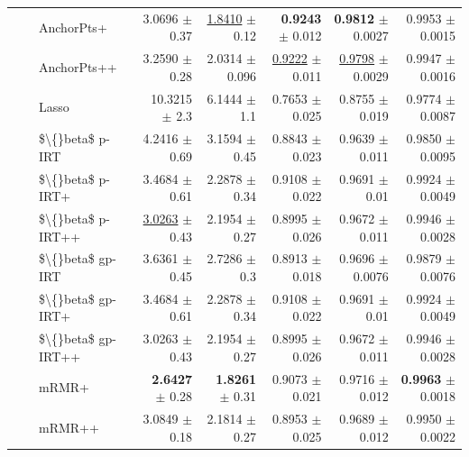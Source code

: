 \begin{longtable}{llp{}rrrrr}
 &  & AnchorPts+ & 3.0696 {\scriptsize $\pm$ 0.37} & \underline{1.8410} {\scriptsize $\pm$ 0.12} & \textbf{0.9243} {\scriptsize $\pm$ 0.012} & \textbf{0.9812} {\scriptsize $\pm$ 0.0027} & 0.9953 {\scriptsize $\pm$ 0.0015} \\
 &  & AnchorPts++ & 3.2590 {\scriptsize $\pm$ 0.28} & 2.0314 {\scriptsize $\pm$ 0.096} & \underline{0.9222} {\scriptsize $\pm$ 0.011} & \underline{0.9798} {\scriptsize $\pm$ 0.0029} & 0.9947 {\scriptsize $\pm$ 0.0016} \\
 &  & Lasso & 10.3215 {\scriptsize $\pm$ 2.3} & 6.1444 {\scriptsize $\pm$ 1.1} & 0.7653 {\scriptsize $\pm$ 0.025} & 0.8755 {\scriptsize $\pm$ 0.019} & 0.9774 {\scriptsize $\pm$ 0.0087} \\
 &  & \$\textbackslash\{\}beta\$ p-IRT & 4.2416 {\scriptsize $\pm$ 0.69} & 3.1594 {\scriptsize $\pm$ 0.45} & 0.8843 {\scriptsize $\pm$ 0.023} & 0.9639 {\scriptsize $\pm$ 0.011} & 0.9850 {\scriptsize $\pm$ 0.0095} \\
 &  & \$\textbackslash\{\}beta\$ p-IRT+ & 3.4684 {\scriptsize $\pm$ 0.61} & 2.2878 {\scriptsize $\pm$ 0.34} & 0.9108 {\scriptsize $\pm$ 0.022} & 0.9691 {\scriptsize $\pm$ 0.01} & 0.9924 {\scriptsize $\pm$ 0.0049} \\
 &  & \$\textbackslash\{\}beta\$ p-IRT++ & \underline{3.0263} {\scriptsize $\pm$ 0.43} & 2.1954 {\scriptsize $\pm$ 0.27} & 0.8995 {\scriptsize $\pm$ 0.026} & 0.9672 {\scriptsize $\pm$ 0.011} & 0.9946 {\scriptsize $\pm$ 0.0028} \\
 &  & \$\textbackslash\{\}beta\$ gp-IRT & 3.6361 {\scriptsize $\pm$ 0.45} & 2.7286 {\scriptsize $\pm$ 0.3} & 0.8913 {\scriptsize $\pm$ 0.018} & 0.9696 {\scriptsize $\pm$ 0.0076} & 0.9879 {\scriptsize $\pm$ 0.0076} \\
 &  & \$\textbackslash\{\}beta\$ gp-IRT+ & 3.4684 {\scriptsize $\pm$ 0.61} & 2.2878 {\scriptsize $\pm$ 0.34} & 0.9108 {\scriptsize $\pm$ 0.022} & 0.9691 {\scriptsize $\pm$ 0.01} & 0.9924 {\scriptsize $\pm$ 0.0049} \\
 &  & \$\textbackslash\{\}beta\$ gp-IRT++ & 3.0263 {\scriptsize $\pm$ 0.43} & 2.1954 {\scriptsize $\pm$ 0.27} & 0.8995 {\scriptsize $\pm$ 0.026} & 0.9672 {\scriptsize $\pm$ 0.011} & 0.9946 {\scriptsize $\pm$ 0.0028} \\
 &  & mRMR+ & \textbf{2.6427} {\scriptsize $\pm$ 0.28} & \textbf{1.8261} {\scriptsize $\pm$ 0.31} & 0.9073 {\scriptsize $\pm$ 0.021} & 0.9716 {\scriptsize $\pm$ 0.012} & \textbf{0.9963} {\scriptsize $\pm$ 0.0018} \\
 &  & mRMR++ & 3.0849 {\scriptsize $\pm$ 0.18} & 2.1814 {\scriptsize $\pm$ 0.27} & 0.8953 {\scriptsize $\pm$ 0.025} & 0.9689 {\scriptsize $\pm$ 0.012} & 0.9950 {\scriptsize $\pm$ 0.0022} \\

\end{longtable}
